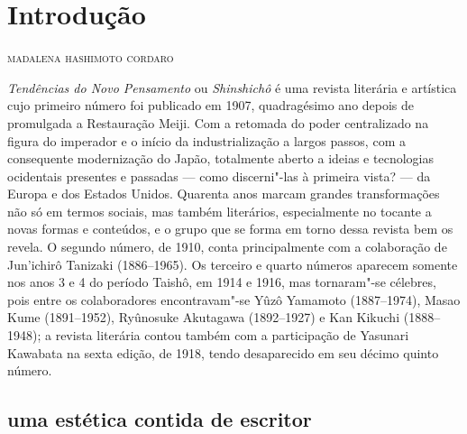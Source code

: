 \chapter*{Introdução\smallskip{}}

\begin{flushright}
\textsc{madalena hashimoto cordaro}
\end{flushright}

\textit{Tendências do Novo Pensamento} ou \textit{Shinshichô} é uma
revista literária e artística cujo primeiro número foi publicado em
1907, quadragésimo ano depois de promulgada a Restauração Meiji. Com a
retomada do poder centralizado na figura do imperador e o início da
industrialização a largos passos, com a consequente modernização do
Japão, totalmente aberto a ideias e tecnologias ocidentais presentes e
passadas --- como discerni"-las à primeira vista? --- da Europa e dos
Estados Unidos. Quarenta anos marcam grandes transformações não só em
termos sociais, mas também literários, especialmente no tocante a novas
formas e conteúdos, e o grupo que se forma em torno dessa revista bem
os revela. O segundo número, de 1910, conta principalmente com a
colaboração de Jun'ichirô Tanizaki (1886--1965). Os terceiro e quarto
números aparecem somente nos anos 3 e 4 do período Taishô, em 1914 e
1916, mas tornaram"-se célebres, pois entre os
colaboradores encontravam"-se Yûzô Yamamoto  (1887--1974), Masao Kume 
(1891--1952), Ryûnosuke Akutagawa  (1892--1927) e Kan Kikuchi 
(1888--1948); a revista literária contou também com a participação de
Yasunari Kawabata  na sexta edição, de 1918, tendo desaparecido em seu
décimo quinto número.

\section*{uma estética contida de escritor}

